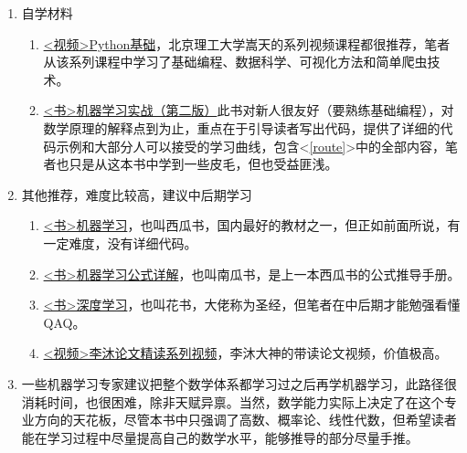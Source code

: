 \documentclass[a5paper, 11pt, openany]{book}
\begin{document}
\begin{enumerate}
    \item 自学材料
    \begin{enumerate}
        \item \href{https://www.bilibili.com/video/BV1JF411L7SD}{<视频>Python基础}，北京理工大学嵩天的系列视频课程都很推荐，笔者从该系列课程中学习了基础编程、数据科学、可视化方法和简单爬虫技术。\label{视频课程}
        \item \href{https://detail.tmall.com/item.htm?abbucket=0&id=629528559505D}{<书>机器学习实战（第二版）}此书对新人很友好（要熟练基础编程），对数学原理的解释点到为止，重点在于引导读者写出代码，提供了详细的代码示例和大部分人可以接受的学习曲线，包含<\ref{route}>中的全部内容，笔者也只是从这本书中学到一些皮毛，但也受益匪浅。
    \end{enumerate}
    \item 其他推荐，难度比较高，建议中后期学习
    \begin{enumerate}
        \item \href{https://detail.tmall.com/item.htm?ali_refid=a3_430582_1006:1106222247:N:H6LEKWw5w+wEVaha6Pu0Aw==:5d2ca6404d6e3a2c4c17a9259c4bff4f&ali_trackid=1_5d2ca6404d6e3a2c4c17a9259c4bff4f&id=540848628472}{<书>机器学习}，也叫西瓜书，国内最好的教材之一，但正如前面所说，有一定难度，没有详细代码。
        \item \href{https://detail.tmall.com/item.htm?abbucket=0&id=638756997988&ns=1&spm=a21n57.1.0.0.f353523cYBsNmp}{<书>机器学习公式详解}，也叫南瓜书，是上一本西瓜书的公式推导手册。
        \item \href{https://detail.tmall.com/item.htm?abbucket=0&id=555191140768&ns=1&spm=a21n57.1.0.0.5ae1523cue95nE}{<书>深度学习}，也叫花书，大佬称为圣经，但笔者在中后期才能勉强看懂QAQ。
        \item \href{https://www.bilibili.com/video/BV1H44y1t75x}{<视频>李沐论文精读系列视频}，李沐大神的带读论文视频，价值极高。
    \end{enumerate}
    \item 一些机器学习专家建议把整个数学体系都学习过之后再学机器学习，此路径很消耗时间，也很困难，除非天赋异禀。当然，数学能力实际上决定了在这个专业方向的天花板，尽管本书中只强调了高数、概率论、线性代数，但希望读者能在学习过程中尽量提高自己的数学水平，能够推导的部分尽量手推。
\end{enumerate}
\end{document}

